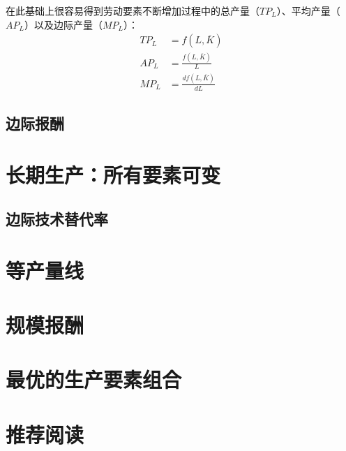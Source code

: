 在此基础上很容易得到劳动要素不断增加过程中的总产量（$TP_L$）、平均产量（$AP_L$）以及边际产量（$MP_L$）：
\begin{align}
TP_L	&= f(L,\overline K)\\
AP_L	&= \frac{f(L,\overline K)}{L}\\
MP_L	&= \frac{{df(L,\overline K)}}{{dL}}
\end{align}

\subsection{边际报酬}


\section{长期生产：所有要素可变}

\subsection{边际技术替代率}

\section{等产量线}

\section{规模报酬}

\section{最优的生产要素组合}










\section*{推荐阅读}
